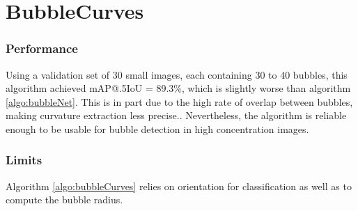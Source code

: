 			\section{BubbleCurves}\label{result_curves}
			
				\subsubsection{Performance}
				Using a validation set of 30 small images, each containing 30 to 40 bubbles, this algorithm achieved mAP@.5IoU = 89.3\%, which is slightly worse than algorithm \ref{algo:bubbleNet}. This is in part due to the high rate of overlap between bubbles, making curvature extraction less precise.. Nevertheless, the algorithm is reliable enough to be usable for bubble detection in high concentration images.					
				
				\subsubsection{Limits}
				Algorithm \ref{algo:bubbleCurves} relies on orientation for classification as well as to compute the bubble radius. 
				
				
				
				
				
				
				
				
				
				
				